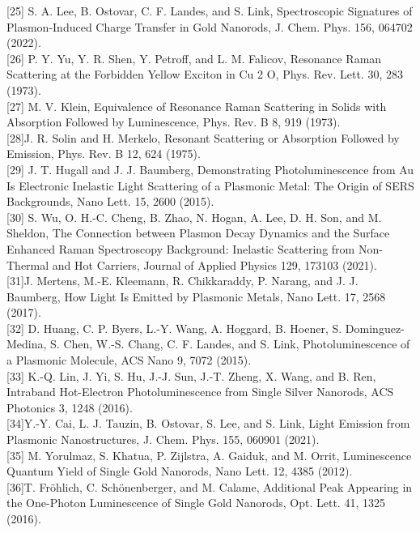 \documentclass[10pt]{article}
\begin{document}
[25] S. A. Lee, B. Ostovar, C. F. Landes, and S. Link, Spectroscopic Signatures of Plasmon-Induced Charge Transfer in Gold Nanorods, J. Chem. Phys. 156, 064702 (2022).\\[0pt]
[26] P. Y. Yu, Y. R. Shen, Y. Petroff, and L. M. Falicov, Resonance Raman Scattering at the Forbidden Yellow Exciton in Cu 2 O, Phys. Rev. Lett. 30, 283 (1973).\\[0pt]
[27] M. V. Klein, Equivalence of Resonance Raman Scattering in Solids with Absorption Followed by Luminescence, Phys. Rev. B 8, 919 (1973).\\[0pt]
[28]J. R. Solin and H. Merkelo, Resonant Scattering or Absorption Followed by Emission, Phys. Rev. B 12, 624 (1975).\\[0pt]
[29] J. T. Hugall and J. J. Baumberg, Demonstrating Photoluminescence from Au Is Electronic Inelastic Light Scattering of a Plasmonic Metal: The Origin of SERS Backgrounds, Nano Lett. 15, 2600 (2015).\\[0pt]
[30] S. Wu, O. H.-C. Cheng, B. Zhao, N. Hogan, A. Lee, D. H. Son, and M. Sheldon, The Connection between Plasmon Decay Dynamics and the Surface Enhanced Raman Spectroscopy Background: Inelastic Scattering from Non-Thermal and Hot Carriers, Journal of Applied Physics 129, 173103 (2021).\\[0pt]
[31]J. Mertens, M.-E. Kleemann, R. Chikkaraddy, P. Narang, and J. J. Baumberg, How Light Is Emitted by Plasmonic Metals, Nano Lett. 17, 2568 (2017).\\[0pt]
[32] D. Huang, C. P. Byers, L.-Y. Wang, A. Hoggard, B. Hoener, S. Dominguez-Medina, S. Chen, W.-S. Chang, C. F. Landes, and S. Link, Photoluminescence of a Plasmonic Molecule, ACS Nano 9, 7072 (2015).\\[0pt]
[33] K.-Q. Lin, J. Yi, S. Hu, J.-J. Sun, J.-T. Zheng, X. Wang, and B. Ren, Intraband Hot-Electron Photoluminescence from Single Silver Nanorods, ACS Photonics 3, 1248 (2016).\\[0pt]
[34]Y.-Y. Cai, L. J. Tauzin, B. Ostovar, S. Lee, and S. Link, Light Emission from Plasmonic Nanostructures, J. Chem. Phys. 155, 060901 (2021).\\[0pt]
[35] M. Yorulmaz, S. Khatua, P. Zijlstra, A. Gaiduk, and M. Orrit, Luminescence Quantum Yield of Single Gold Nanorods, Nano Lett. 12, 4385 (2012).\\[0pt]
[36]T. Fröhlich, C. Schönenberger, and M. Calame, Additional Peak Appearing in the One-Photon Luminescence of Single Gold Nanorods, Opt. Lett. 41, 1325 (2016).\\[0pt]
\end{document}
